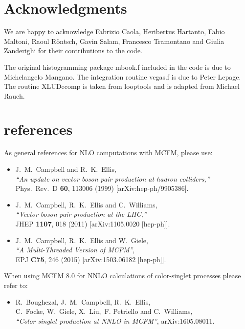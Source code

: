 \documentclass[12pt]{article}
\begin{document}
\section*{Acknowledgments}
We are happy to acknowledge Fabrizio Caola, Heribertus Hartanto, Fabio
Maltoni, Raoul R{\"o}ntsch, Gavin Salam, Francesco Tramontano and
Giulia Zanderighi for their contributions to the code.

The original histogramming package mbook.f included in the code is due
to Michelangelo Mangano.  The integration routine vegas.f is due to
Peter Lepage.  The routine XLUDecomp is taken from looptools and is
adapted from Michael Rauch.



\appendix
\section{\MCFM references}
\label{MCFMrefs}

As general references for NLO computations with MCFM, please use:
\begin{itemize}
\item J.~M.~Campbell and R.~K.~Ellis, \\
  {\it ``An update on vector boson pair production at hadron colliders,''} \\
  Phys.\ Rev.\ D {\bf 60}, 113006 (1999)
  [arXiv:hep-ph/9905386].
\item J.~M.~Campbell, R.~K.~Ellis and C.~Williams, \\
  {\it ``Vector boson pair production at the LHC,''} \\
  JHEP {\bf 1107}, 018 (2011)
  [arXiv:1105.0020 [hep-ph]]. 
\item J.~M.~Campbell, R.~K.~Ellis and W.~Giele, \\
  {\it ``A Multi-Threaded Version of MCFM''}, \\
    EPJ {\bf C75}, 246 (2015)
    [arXiv:1503.06182 [hep-ph]].

\end{itemize}

When using MCFM 8.0 for NNLO calculations of color-singlet processes please refer to:
\begin{itemize}
\item 
  R.~Boughezal, J.~M.~Campbell, R.~K.~Ellis, \\
   C.~Focke, W.~Giele, X.~Liu,~F. Petriello and  C.~Williams, \\
  {\it ``Color singlet production at NNLO in MCFM''},
  arXiv:1605.08011.
\end{itemize}
\end{document}
